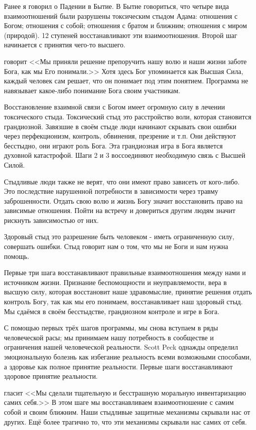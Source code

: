 \documentclass[10pt, fleqn]{article}
\begin{document}
Ранее я говорил о Падении в Бытие. В Бытие говориться, что четыре вида взаимоотношений были разрушены токсическим стыдом Адама: отношения с Богом; отношения с собой; отношения с братом и ближним; отношения с миром (природой). 12 ступеней восстанавливают эти взаимоотношения. Второй шаг начинается с принятия чего-то высшего. 

 говорит <<Мы приняли решение препоручить нашу волю и наши жизни заботе Бога, как мы Его понимали.>> Хотя здесь Бог упоминается как Высшая Сила, каждый человек сам решает, что он понимает под этим понятием. Программа не навязывает какое-либо понимание Бога своим участникам.

Восстановление взаимной связи с Богом имеет огромную силу в лечении токсического стыда. Токсический стыд это расстройство воли, которая становится грандиозной. Завязшие в своём стыде люди начинают скрывать свои ошибки через перфекционизм, контроль, обвинения, презрение и т.п. Они действуют бесстыдно, они играют роль Бога. Эта грандиозная игра в Бога является духовной катастрофой. Шаги 2 и 3 воссоединяют необходимую связь с Высшей Силой.

Стыдливые люди также не верят, что они имеют право зависеть от кого-либо. Это последствие нарушенной потребности в зависимости через травму заброшенности. Отдать свою волю и жизнь Богу значит восстановить право на зависимые отношения. Пойти на встречу и довериться другим людям значит рискнуть зависимостью от них.

Здоровый стыд это разрешение быть человеком - иметь ограниченную силу, совершать ошибки. Стыд говорит нам о том, что мы не Боги и нам нужна помощь.

Первые три шага восстанавливают правильные взаимоотношения между нами и источником жизни. Признание беспомощности и неуправляемости, вера в высшую силу, которая восстановит наше здравомыслие, принятие решения отдать контроль Богу, так как мы его понимаем, восстанавливает наш здоровый стыд. Мы сдаёмся в своём бесстыдстве, грандиозном контроле и игре в Бога.

С помощью первых трёх шагов программы, мы снова вступаем в ряды человеческой расы; мы принимаем нашу потребность в сообществе и ограничения нашей человеческой реальности. Scott Peck однажды определил эмоциональную болезнь как избегание реальность всеми возможными способами, а здоровье как полное принятие реальности. Первые шаги восстанавливают здоровое принятие реальности.


 гласит <<Мы сделали тщательную и бесстрашную моральную инвентаризацию самих себя.>>
В этом шаге мы восстанавливаем взаимоотношение с самим собой и своим ближним. Наши стыдливые защитные механизмы скрывали нас от других. Ещё более трагично то, что эти механизмы скрывали нас самих от себя.
\end{document}

